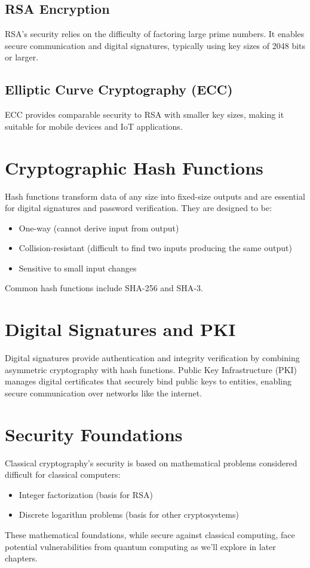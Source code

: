 \subsection{RSA Encryption}
RSA's security relies on the difficulty of factoring large prime numbers. It enables secure communication and digital signatures, typically using key sizes of 2048 bits or larger.

\subsection{Elliptic Curve Cryptography (ECC)}
ECC provides comparable security to RSA with smaller key sizes, making it suitable for mobile devices and IoT applications.

\section{Cryptographic Hash Functions}
Hash functions transform data of any size into fixed-size outputs and are essential for digital signatures and password verification. They are designed to be:
\begin{itemize}
    \item One-way (cannot derive input from output)
    \item Collision-resistant (difficult to find two inputs producing the same output)
    \item Sensitive to small input changes
\end{itemize}

Common hash functions include SHA-256 and SHA-3.

\section{Digital Signatures and PKI}
Digital signatures provide authentication and integrity verification by combining asymmetric cryptography with hash functions. Public Key Infrastructure (PKI) manages digital certificates that securely bind public keys to entities, enabling secure communication over networks like the internet.

\section{Security Foundations}
Classical cryptography's security is based on mathematical problems considered difficult for classical computers:
\begin{itemize}
    \item Integer factorization (basis for RSA)
    \item Discrete logarithm problems (basis for other cryptosystems)
\end{itemize}

These mathematical foundations, while secure against classical computing, face potential vulnerabilities from quantum computing as we'll explore in later chapters.